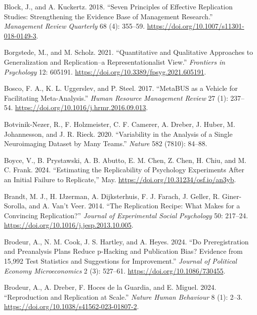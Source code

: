 \documentclass[
  letterpaper,
  DIV=11,
  openany,
  fontsize=12pt,
  parskip=half,
  headings=big,
  numbers=noenddot,
  titlepage=false]{scrreprt}
\newlength{\cslhangindent}
\newenvironment{CSLReferences}[2] %
 {\begin{list}{}{%
  \setlength{\itemindent}{0pt}
  \setlength{\leftmargin}{0pt}
  \setlength{\parsep}{0pt}
  \ifodd #1
   \setlength{\leftmargin}{\cslhangindent}
   \setlength{\itemindent}{-1\cslhangindent}
  \fi
  \setlength{\itemsep}{#2\baselineskip}}}
 {\end{list}}
\begin{document}
\begin{CSLReferences}{1}{0}
Block, J., and A. Kuckertz. 2018. {``Seven Principles of Effective
Replication Studies: Strengthening the Evidence Base of Management
Research.''} \emph{Management Review Quarterly} 68 (4): 355--59.
\url{https://doi.org/10.1007/s11301-018-0149-3}.

Borgstede, M., and M. Scholz. 2021. {``Quantitative and Qualitative
Approaches to Generalization and Replication--a Representationalist
View.''} \emph{Frontiers in Psychology} 12: 605191.
\url{https://doi.org/10.3389/fpsyg.2021.605191}.

Bosco, F. A., K. L. Uggerslev, and P. Steel. 2017. {``MetaBUS as a
Vehicle for Facilitating Meta-Analysis.''} \emph{Human Resource
Management Review} 27 (1): 237--54.
\url{https://doi.org/10.1016/j.hrmr.2016.09.013}.

Botvinik-Nezer, R., F. Holzmeister, C. F. Camerer, A. Dreber, J. Huber,
M. Johannesson, and J. R. Rieck. 2020. {``Variability in the Analysis of
a Single Neuroimaging Dataset by Many Teams.''} \emph{Nature} 582
(7810): 84--88.

Boyce, V., B. Prystawski, A. B. Abutto, E. M. Chen, Z. Chen, H. Chiu,
and M. C. Frank. 2024. {``Estimating the Replicability of Psychology
Experiments After an Initial Failure to Replicate,''} May.
\url{https://doi.org/10.31234/osf.io/an3yb}.

Brandt, M. J., H. IJzerman, A. Dijksterhuis, F. J. Farach, J. Geller, R.
Giner-Sorolla, and A. Van't Veer. 2014. {``The Replication Recipe: What
Makes for a Convincing Replication?''} \emph{Journal of Experimental
Social Psychology} 50: 217--24.
\url{https://doi.org/10.1016/j.jesp.2013.10.005}.

Brodeur, A., N. M. Cook, J. S. Hartley, and A. Heyes. 2024. {``Do
Preregistration and Preanalysis Plans Reduce p-Hacking and Publication
Bias? Evidence from 15,992 Test Statistics and Suggestions for
Improvement.''} \emph{Journal of Political Economy Microeconomics} 2
(3): 527--61. \url{https://doi.org/10.1086/730455}.

Brodeur, A., A. Dreber, F. Hoces de la Guardia, and E. Miguel. 2024.
{``Reproduction and Replication at Scale.''} \emph{Nature Human
Behaviour} 8 (1): 2--3.
\url{https://doi.org/10.1038/s41562-023-01807-2}.


\end{CSLReferences}
\end{document}
